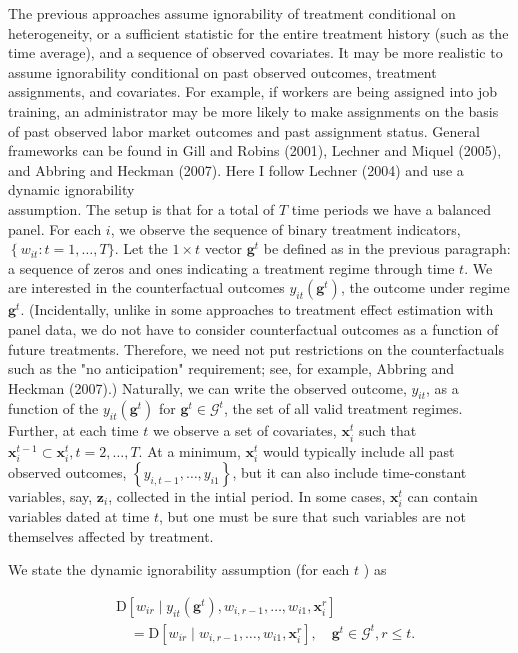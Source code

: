 \documentclass[10pt]{article}
\begin{document}
The previous approaches assume ignorability of treatment conditional on heterogeneity, or a sufficient statistic for the entire treatment history (such as the time average), and a sequence of observed covariates. It may be more realistic to assume ignorability conditional on past observed outcomes, treatment assignments, and covariates. For example, if workers are being assigned into job training, an administrator may be more likely to make assignments on the basis of past observed labor market outcomes and past assignment status. General frameworks can be found in Gill and Robins (2001), Lechner and Miquel (2005), and Abbring and Heckman (2007). Here I follow Lechner (2004) and use a dynamic ignorability\\
assumption. The setup is that for a total of $T$ time periods we have a balanced panel. For each $i$, we observe the sequence of binary treatment indicators, $\left\{w_{i t}: t=\right. 1, \ldots, T\}$. Let the $1 \times t$ vector $\mathbf{g}^{t}$ be defined as in the previous paragraph: a sequence of zeros and ones indicating a treatment regime through time $t$. We are interested in the counterfactual outcomes $y_{i t}\left(\mathbf{g}^{t}\right)$, the outcome under regime $\mathbf{g}^{t}$. (Incidentally, unlike in some approaches to treatment effect estimation with panel data, we do not have to consider counterfactual outcomes as a function of future treatments. Therefore, we need not put restrictions on the counterfactuals such as the "no anticipation" requirement; see, for example, Abbring and Heckman (2007).) Naturally, we can write the observed outcome, $y_{i t}$, as a function of the $y_{i t}\left(\mathbf{g}^{t}\right)$ for $\mathbf{g}^{t} \in \mathscr{G}^{t}$, the set of all valid treatment regimes. Further, at each time $t$ we observe a set of covariates, $\mathbf{x}_{i}^{t}$ such that $\mathbf{x}_{i}^{t-1} \subset \mathbf{x}_{i}^{t}, t=2, \ldots, T$. At a minimum, $\mathbf{x}_{i}^{t}$ would typically include all past observed outcomes, $\left\{y_{i, t-1}, \ldots, y_{i 1}\right\}$, but it can also include time-constant variables, say, $\mathbf{z}_{i}$, collected in the intial period. In some cases, $\mathbf{x}_{i}^{t}$ can contain variables dated at time $t$, but one must be sure that such variables are not themselves affected by treatment.

We state the dynamic ignorability assumption (for each $t$ ) as


\begin{align*}
& \mathrm{D}\left[w_{i r} \mid y_{i t}\left(\mathbf{g}^{t}\right), w_{i, r-1}, \ldots, w_{i 1}, \mathbf{x}_{i}^{r}\right] \\
& \quad=\mathrm{D}\left[w_{i r} \mid w_{i, r-1}, \ldots, w_{i 1}, \mathbf{x}_{i}^{r}\right], \quad \mathbf{g}^{t} \in \mathscr{G}^{t}, r \leq t . \tag{21.138}
\end{align*}
\end{document}
